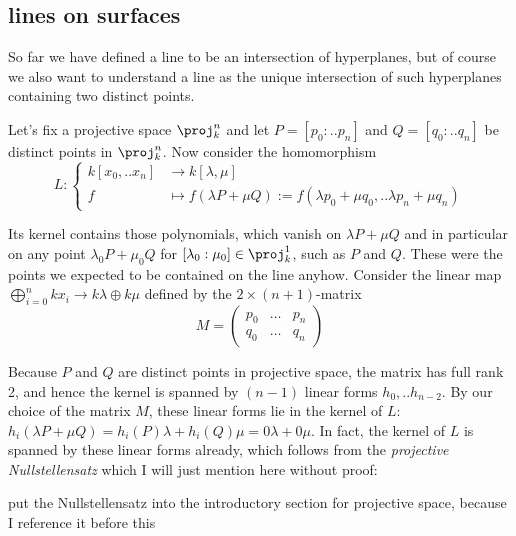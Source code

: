 \subsection{lines on surfaces}


So far we have defined a line to be an intersection of hyperplanes, but of course we also want to understand a line as the unique intersection of such hyperplanes containing two distinct points.

Let's fix a projective space $\proj^n_k$ and let $P=[p_0:..p_n]$ and $Q=[q_0:..q_n]$ be distinct points in $\proj^n_k$. Now consider the homomorphism
\begin{equation}
L : \begin{cases}
k[x_0,..x_n] &\to k[\lambda,\mu] \\
f &\mapsto f(\lambda P + \mu Q) := f(\lambda p_0 + \mu q_0, .. \lambda p_n + \mu q_n)
\end{cases}
\end{equation}

Its kernel contains those polynomials, which vanish on $\lambda P + \mu Q$ and in particular on any point $\lambda_0 P + \mu_0 Q$ for $[\lambda_0:\mu_0] \in \proj^1_k$, such as $P$ and $Q$.
These were the points we expected to be contained on the line anyhow.
Consider the linear map $\bigoplus_{i=0}^n kx_i \to k\lambda \oplus k\mu$ defined by the $2\times (n+1)$-matrix
\begin{equation}
M=
\begin{pmatrix}
p_0 & \ldots & p_n \\
q_0 & \ldots & q_n
\end{pmatrix}
\end{equation}

Because $P$ and $Q$ are distinct points in projective space, the matrix has full rank 2, and hence the kernel is spanned by $(n-1)$ linear forms $h_0,..h_{n-2}$.
By our choice of the matrix $M$, these linear forms lie in the kernel of $L$: $h_i(\lambda P + \mu Q) = h_i(P) \lambda + h_i(Q)\mu = 0 \lambda + 0 \mu$.
In fact, the kernel of $L$ is spanned by these linear forms already, which follows from the \emph{projective Nullstellensatz} which I will just mention here without proof:

\begin{todo}
\item put the Nullstellensatz into the introductory section for projective space, because I reference it before this
\end{todo}

